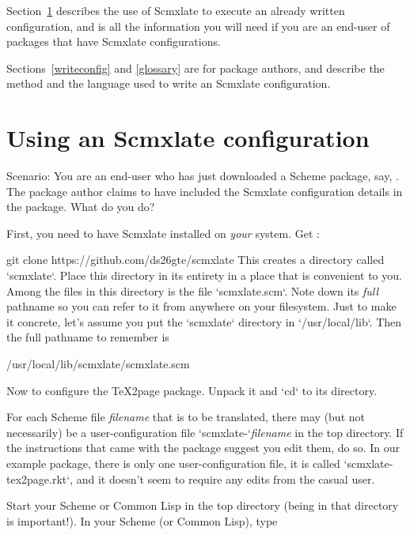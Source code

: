 Section~\ref{useconfig} describes the use of Scmxlate
to execute an already written configuration, and is all
the information you will need if you are an
end-user of packages that have Scmxlate configurations.

Sections~\ref{writeconfig} and \ref{glossary} are for
package authors, and describe the method and the
language used to write an Scmxlate configuration.

\bigbreak


\tableofcontents

\ifx\shipout\totheWeb\else
\vfill\eject
\fi

\section{Using an Scmxlate configuration}
\label{useconfig}

Scenario: You are an end-user who has just downloaded a
Scheme package, say,
.
The package author claims to have included the Scmxlate
configuration details in the package.  What do
you do?

First, you need to have Scmxlate installed on {\em
your} system.  Get
:

\begintt
git clone https://github.com/ds26gte/scmxlate
\endtt
This creates a directory called `scmxlate`.  Place
this directory in its entirety in a place that is
convenient to you.  Among the files in this directory
is the file `scmxlate.scm`.  Note down
its {\em full} pathname so you can refer to it from
anywhere on your filesystem.
Just to make it concrete, let’s assume you put the
`scmxlate` directory in `/usr/local/lib`.  Then the
full pathname to remember is

\begintt
/usr/local/lib/scmxlate/scmxlate.scm
\endtt

Now to configure the TeX2page package.  Unpack it
and `cd` to its directory.

For each Scheme file {\em filename}  that is to be
translated, there may (but not necessarily) be a
user-configuration file `scmxlate-`{\em filename} in
the top directory.  If the instructions that came with
the package suggest you edit them, do so.  In our
example package, there is only one user-configuration
file, it is called `scmxlate-tex2page.rkt`, and it
doesn’t seem to require any edits from the casual user.

Start your Scheme or Common Lisp in the top directory
(being in that directory is important!).  In your
Scheme (or Common Lisp), type

